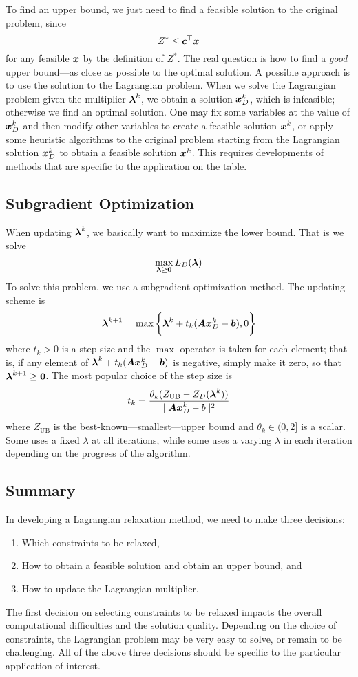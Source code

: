 To find an upper bound, we just need to find a feasible solution to the original problem, since
\[
	Z^* \leq \boldsymbol{c}^\top \boldsymbol{x}
\]
for any feasible $\boldsymbol{x}$ by the definition of $Z^*$. The real question is how to find a \emph{good} upper bound---as close as possible to the optimal solution. A possible approach is to use the solution to the Lagrangian problem. When we solve the Lagrangian problem given the multiplier $\boldsymbol{\lambda}^k$, we obtain a solution $\boldsymbol{x}_D^k$, which is infeasible; otherwise we find an optimal solution. One may fix some variables at the value of $\boldsymbol{x}_D^k$ and then modify other variables to create a feasible solution $\boldsymbol{x}^k$, or apply some heuristic algorithms to the original problem starting from the Lagrangian solution $\boldsymbol{x}_D^k$ to obtain a feasible solution $\boldsymbol{x}^k$. This requires developments of methods that are specific to the application on the table.


\subsection{Subgradient Optimization}

When updating $\boldsymbol{\lambda}^k$, we basically want to maximize the lower bound. That is we solve
\[
	\max_{\boldsymbol{\lambda}\geq\boldsymbol{0}} L_D(\boldsymbol{\lambda})
\]
To solve this problem, we use a subgradient optimization method. The updating scheme is
\[
	\boldsymbol{\lambda}^{k+1} = \max\bigg\{ \boldsymbol{\lambda}^k + t_k (\boldsymbol{A}\boldsymbol{x}_D^k - \boldsymbol{b} ), 0 \bigg\}
\]
where $t_k>0$ is a step size and the $\max$ operator is taken for each element; that is, if any element of $\boldsymbol{\lambda}^k + t_k (\boldsymbol{A}\boldsymbol{x}_D^k - \boldsymbol{b})$ is negative, simply make it zero, so that $\boldsymbol{\lambda}^{k+1}\geq \boldsymbol{0}$. The most popular choice of the step size is
\[
	t_k = \frac{ \theta_k ( Z_\text{UB} - Z_D(\boldsymbol{\lambda}^k) ) }
			   {  || \boldsymbol{A}\boldsymbol{x}_D^k - b ||^2 }
\]
where $Z_\text{UB}$ is the best-known---smallest---upper bound and $\theta_k\in(0,2]$ is a scalar. Some uses a fixed $\lambda$ at all iterations, while some uses a varying $\lambda$ in each iteration depending on the progress of the algorithm.


\subsection{Summary}

In developing a Lagrangian relaxation method, we need to make three decisions:
\begin{enumerate}
\item Which constraints to be relaxed,
\item How to obtain a feasible solution and obtain an upper bound, and
\item How to update the Lagrangian multiplier.
\end{enumerate}
The first decision on selecting constraints to be relaxed impacts the overall computational difficulties and the solution quality. Depending on the choice of constraints, the Lagrangian problem may be very easy to solve, or remain to be challenging. All of the above three decisions should be specific to the particular application of interest.



